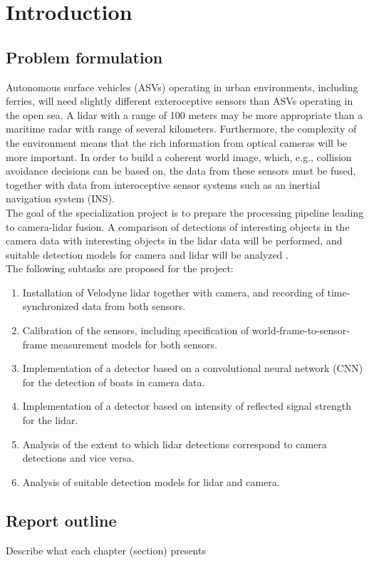 
\chapter{Introduction}

\section{Problem formulation}
Autonomous surface vehicles (ASVs) operating in urban environments, including ferries, will need slightly different exteroceptive sensors than ASVs operating in the open sea. A lidar with a range of 100 meters may be more appropriate than a maritime radar with range of several kilometers. Furthermore, the complexity of the environment means that the rich information from optical cameras will be more important. In order to build a coherent world image, which, e.g., collision avoidance decisions can be based on, the data from these sensors must be fused, together with data from interoceptive sensor systems such as an inertial navigation system (INS).\smallskip \\
The goal of the specialization project is to prepare the processing pipeline leading to camera-lidar fusion. A comparison of detections of interesting objects in the camera data with interesting objects in the lidar data will be performed, and suitable detection models for camera and lidar will be analyzed .\smallskip \\
The following subtasks are proposed for the project:
\begin{enumerate}
    \item Installation of Velodyne lidar together with camera, and recording of time-synchronized data from both sensors.
    \item Calibration of the sensors, including specification of world-frame-to-sensor-frame measurement models for both sensors.
    \item Implementation of a detector based on a convolutional neural network (CNN) for the detection of boats in camera data.
    \item Implementation of a detector based on intensity of reflected signal strength for the lidar.
    \item Analysis of the extent to which lidar detections correspond to camera detections and vice versa.
    \item Analysis of suitable detection models for lidar and camera.
\end{enumerate}

\section{Report outline}
Describe what each chapter (section) presents

\cleardoublepage
